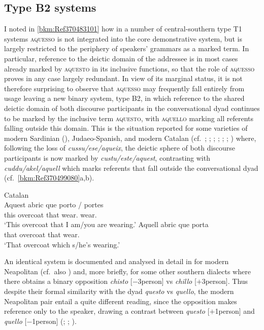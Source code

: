 \documentclass[output=paper]{langsci/langscibook}
\begin{document}
\subsection{Type B2 systems}\label{bkm:Ref370495450}

I noted in \cref{bkm:Ref370483101} how in a number of central-southern 
type T1 systems \textsc{aques\-so} is not integrated into the core demonstrative
system, but is largely restricted to the periphery of speakers’ grammars as a
marked term. In particular, reference to the deictic domain of the addressee is
in most cases already marked by \textsc{aquesto} in its inclusive functions, so
that the role of \textsc{aquesso} proves in any case largely redundant. In view
of its marginal status, it is not therefore surprising to observe that
\textsc{aquesso} may frequently fall entirely from usage leaving a new binary
system, type B2, in which reference to the shared deictic domain of both
discourse participants in the conversational dyad continues to be marked by the
inclusive term \textsc{aquesto}, with \textsc{aquello} marking all referents
falling outside this domain. This is the situation reported for some varieties
of modern Sardinian (\citealt[839]{Blasco-Ferrer:1988a}), Judaeo-Spanish, and
modern Catalan (cf.\ \citealt[281]{Badia-i-Margarit:1951a};
\citealt[501]{Badia-i-Margarit:1995a}; \citealt[81]{Duarte-i-Montserrat:1986a};
\citealt[120f]{Hualde:1992a}; \citealt[106]{Wheeler:1999a};
\citealt[§3.3]{Da-Milano:2007a};
\citealt[208f]{Nogue-Serrano:2015a}) where, following the loss of
\emph{cussu/ese/aqueix}, the deictic sphere of both discourse participants is
now marked by \emph{custu/este/aquest}, contrasting with
\emph{cuddu/akel/aquell} which marks referents that fall outside the
conversational dyad (cf.\ \ref{bkm:Ref370499080}a,b).

\ea\label{bkm:Ref370499080}Catalan \citep{Wheeler:1999a}\\
    \ea
        \gll Aquest  abric  que  porto  /  portes\\
        this  overcoat  that  wear.\Fsg{} {} wear.\Ssg{}\\
        \glt \enquote*{This overcoat that I am/you are wearing.}
    \ex
    \gll Aquell  abric  que  porta\\
         that  overcoat  that  wear.\Tsg{}\\
    \glt \enquote*{That overcoat which s/he’s wearing.}
    \z
\z

An identical system is documented and analysed in detail in
\citet[96--104]{ledgeway2004sviluppo} for modern Neapolitan (cf.\ also
\citealt[195--212]{Ledgeway:2009a}) and, more briefly, for some other southern
dialects where there obtains a binary opposition \emph{chisto}
[$-$3person] vs \emph{chillo} [$+$3person]. Thus despite their formal
similarity with the  dyad \emph{questo} vs \emph{quello}, the modern
Neapolitan pair entail a quite different reading, since the  opposition
makes reference only to the speaker, drawing a contrast between \emph{questo}
[$+$1person] and \emph{quello} [$-$1person]
(\citealt[125]{Maiden:1995a}; \citealt[324]{Vanelli:1995a};
\citealt[82f]{Maiden:2000a}).
\end{document}
